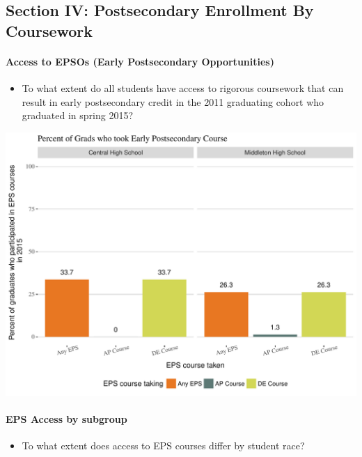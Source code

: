 \documentclass[11pt,]{article}
\providecommand{\tightlist}{%
  \setlength{\itemsep}{0pt}\setlength{\parskip}{0pt}}
\let\oldparagraph\paragraph
\renewcommand{\paragraph}[1]{\oldparagraph{#1}\mbox{}}
\begin{document}
\newpage

\subsection{Section IV: Postsecondary Enrollment By
Coursework}\label{section-iv-postsecondary-enrollment-by-coursework}

\paragraph{Access to EPSOs (Early Postsecondary
Opportunities)}\label{access-to-epsos-early-postsecondary-opportunities}

\begin{itemize}
\tightlist
\item
  To what extent do all students have access to rigorous coursework that
  can result in early postsecondary credit in the 2011 graduating cohort
  who graduated in spring 2015?
\end{itemize}

\includegraphics{20170411_PSWRR_no_CTE_files/figure-latex/Figure9a-1.pdf}

\newpage 

\paragraph{EPS Access by subgroup}\label{eps-access-by-subgroup}

\begin{itemize}
\tightlist
\item
  To what extent does access to EPS courses differ by student race?
\end{itemize}
\end{document}
